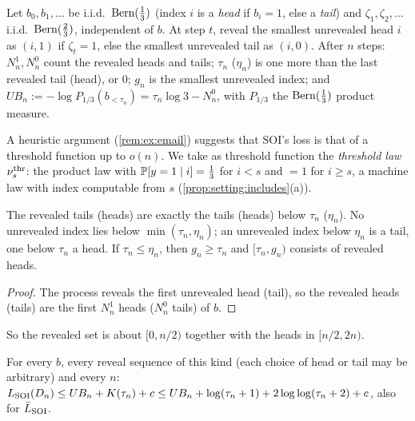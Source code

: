 \begin{definition}\label{def:ex:eisenstat}
Let $b_0,b_1,\dots$ be i.i.d.\ $\operatorname{Bern}(\frac13)$ (index $i$ is a \emph{head} if $b_i=1$, else a \emph{tail}) and $\zeta_1,\zeta_2,\dots$ i.i.d.\ $\operatorname{Bern}(\frac23)$, independent of $b$. At step $t$, reveal the smallest unrevealed head $i$ as $(i,1)$ if $\zeta_t=1$, else the smallest unrevealed tail as $(i,0)$. After $n$ steps: $N^1_n,N^0_n$ count the revealed heads and tails; $\tau_n$ ($\eta_n$) is one more than the last revealed tail (head), or $0$; $g_n$ is the smallest unrevealed index; and $UB_n:=-\log P_{1/3}(b_{<\tau_n})=\tau_n\log3-N^0_n$, with $P_{1/3}$ the $\operatorname{Bern}(\frac13)$ product measure.
\end{definition}

A heuristic argument (\cref{rem:ex:email}) suggests that SOI's loss is that of a threshold function up to $o(n)$. We take as threshold function the \emph{threshold law} $\nu^{\rm thr}_s$: the product law with $\mathbb{P}[y=1\mid i]=\frac13$ for $i<s$ and $=1$ for $i\ge s$, a machine law with index computable from $s$ (\cref{prop:setting:includes}(a)).

\begin{lemma}\label{lem:ex:shape}
The revealed tails (heads) are exactly the tails (heads) below $\tau_n$ ($\eta_n$). No unrevealed index lies below $\min(\tau_n,\eta_n)$; an unrevealed index below $\eta_n$ is a tail, one below $\tau_n$ a head. If $\tau_n\le\eta_n$, then $g_n\ge\tau_n$ and $[\tau_n,g_n)$ consists of revealed heads.
\end{lemma}

\begin{proof}
The process reveals the first unrevealed head (tail), so the revealed heads (tails) are the first $N^1_n$ heads ($N^0_n$ tails) of $b$.
\end{proof}

So the revealed set is about $[0,n/2)$ together with the heads in $[n/2,2n)$.

\begin{proposition}\label{prop:ex:UB}
For every $b$, every reveal sequence of this kind (each choice of head or tail may be arbitrary) and every $n$: $L_{\mathrm{SOI}}(D_n)\le UB_n+K(\tau_n)+c\le UB_n+\log(\tau_n+1)+2\log\log(\tau_n+2)+c$, also for $\bar{L}_{\mathrm{SOI}}$.
\end{proposition}

